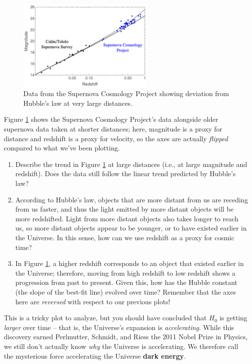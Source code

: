 \documentclass[11pt]{article}
\begin{document}
\begin{figure}[h!]
    \centering
    \includegraphics[width=0.6\textwidth]{Images/acceleration2.PNG}
    \caption{Data from the Supernova Cosmology Project showing deviation from Hubble's law at very large distances.}
    \label{fig:acceleration}
\end{figure}
\medskip \noindent
Figure \ref{fig:acceleration} shows the Supernova Cosmology Project's data alongside older supernova data taken at shorter distances; here, magnitude is a proxy for distance and redshift is a proxy for velocity, so the axes are actually \emph{flipped} compared to what we've been plotting. 
\begin{enumerate}
    \item Describe the trend in Figure \ref{fig:acceleration} at large distances (i.e., at large magnitude and redshift). Does the data still follow the linear trend predicted by Hubble's law?
    
    \item According to Hubble's law, objects that are more distant from us are receding from us faster, and thus the light emitted by more distant objects will be more redshifted. Light from more distant objects also takes longer to reach us, so more distant objects appear to be younger, or to have existed earlier in the Universe. In this sense, how can we use redshift as a proxy for cosmic time?   
    
    \item In Figure \ref{fig:acceleration}, a higher redshift corresponds to an object that existed earlier in the Universe; therefore, moving from high redshift to low redshift shows a progression from past to present. Given this, how has the Hubble constant (the slope of the best-fit line) evolved over time? Remember that the axes here are \emph{reversed} with respect to our previous plots!
\end{enumerate}

\noindent
This is a tricky plot to analyze, but you should have concluded that $H_0$ is getting \emph{larger} over time -- that is, the Universe's expansion is \emph{accelerating}. While this discovery earned Perlmutter, Schmidt, and Riess the 2011 Nobel Prize in Physics, we still don't actually know \emph{why} the Universe is accelerating. We therefore call the mysterious force accelerating the Universe \textbf{dark energy}.  
\end{document}
